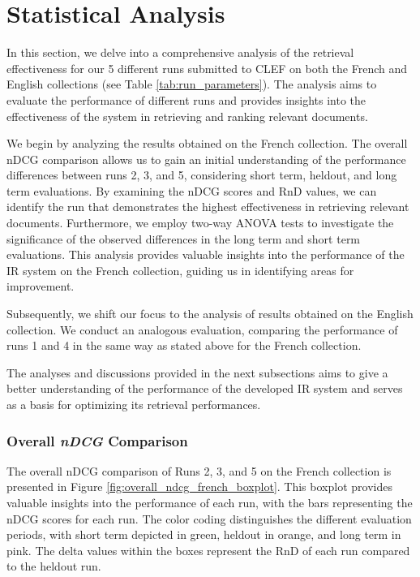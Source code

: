 \section{Statistical Analysis}
\label{sec:analysis}

In this section, we delve into a comprehensive analysis of the retrieval effectiveness for our 5 different runs submitted to \ac{CLEF} on both the French and English collections (see Table \ref{tab:run_parameters}). 
The analysis aims to evaluate the performance of different runs and provides insights into the effectiveness of the system in retrieving and ranking relevant documents.

We begin by analyzing the results obtained on the French collection. 
The overall \ac{nDCG} comparison allows us to gain an initial understanding of the performance differences between runs 2, 3, and 5, considering short term, heldout, and long term evaluations. 
By examining the \ac{nDCG} scores and \ac{RnD} values, we can identify the run that demonstrates the highest effectiveness in retrieving relevant documents. 
Furthermore, we employ two-way \ac{ANOVA} tests to investigate the significance of the observed differences in the long term and short term evaluations. 
This analysis provides valuable insights into the performance of the \ac{IR} system on the French collection, guiding us in identifying areas for improvement.

Subsequently, we shift our focus to the analysis of results obtained on the English collection. 
We conduct an analogous evaluation, comparing the performance of runs 1 and 4 in the same way as stated above for the French collection. 

The analyses and discussions provided in the next subsections aims to give a better understanding of the performance of the developed \ac{IR} system and serves as a basis for optimizing its retrieval performances.

\newpage
\subsubsection{Overall \textit{nDCG} Comparison}  \label{sec:ndcg_comparison_french}

The overall \ac{nDCG} comparison of Runs 2, 3, and 5 on the French collection is presented in Figure \ref{fig:overall_ndcg_french_boxplot}. 
This boxplot provides valuable insights into the performance of each run, with the bars representing the \ac{nDCG} scores for each run. 
The color coding distinguishes the different evaluation periods, with short term depicted in green, heldout in orange, and long term in pink. 
The delta values within the boxes represent the \ac{RnD} of each run compared to the heldout run.

